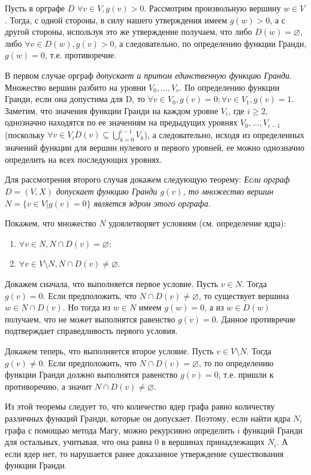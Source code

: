 \documentclass[12pt, letterpaper, titlepage]{article}
\let\emptyset\varnothing
\begin{document}
Пусть в орграфе $D$ $\forall v \in V, g(v)>0$. Рассмотрим произвольную вершину $w \in V$. Тогда, с одной стороны, в силу нашего утверждения
имеем $g(w)>0$, а с другой стороны, используя это же утверждение получаем, что либо $D(w)=\emptyset$, либо $\forall v \in D(w),g(v)>0$, а следовательно,
по определению  функции Гранди, $g(w)=0$, т.е. противоречие.

В первом случае орграф \emph{допускает и притом единственную функцию Гранди}. Множество вершин разбито на уровни $V_0, \dots, V_r$.
По определению функции Гранди, если она допустима для D, то $\forall v \in V_0, g(v)=0; \forall v \in V_1, g(v)=1$.
Заметим, что значения функции Гранди на каждом уровне $V_i$, где $i \geq 2$, однозначно находятся по ее значениям на предыдущих
уровнях $V_0, \dots, V_{i-1}$ (поскольку $\forall v \in V_i D(v) \subseteq \bigcup_{k=0}^{i-1} V_k$), а следовательно, исходя из определенных
значений функции для вершин нулевого и первого уровней, ее можно однозначно определить на всех последующих уровнях.

Для рассмотрения второго случая докажем следующую теорему: \emph{Если орграф $D=(V,X)$ допускает функцию Гранди $g(v)$, то множество вершин
$N=\{v \in V | g(v) =0\}$ является ядром этого орграфа}.

Покажем, что множество $N$ удовлетворяет условиям (см. определение ядра):

\begin{enumerate}
    \item $\forall v \in N, N\cap D(v)=\emptyset$;
    \item $\forall v \in V \setminus N, N \cap D(v) \neq \emptyset$.
\end{enumerate}

Докажем сначала, что выполняется первое условие. Пусть $v \in N$. Тогда $g(v)=0$.
Если предположить, что $N \cap D(v) \neq \emptyset$, то существует вершина $w \in N \cap D(v)$.
Но тогда из $w \in N$ имеем $g(w) = 0$, а из $w \in D(w)$ получаем, что не может выполнятся равенство
$g(v)=0$. Данное противречие подтверждает справедливость первого условия.

Докажем теперь, что выполняется второе условие. Пусть $v \in V \setminus N$. Тогда
$g(v) \neq 0$. Если предположить, что $N \cap D(v) = \emptyset$, то по определению
функции Гранди должно выполнятся равенство $g(v)=0$, т.е. пришли к противоречию, а значит
$N \cap D(v) \neq \emptyset$.

Из этой теоремы следует то, что количество ядер графа равно количеству различных функций Гранди, которые он допускает.
Поэтому, если найти ядра $N_i$ графа с помощью метода Магу, можно рекурсивно определить $i$ функций Гранди для остальных, учитывая, что
она равна 0 в вершинах принадлежащих $N_i$. А если ядер нет, то нарушается ранее доказанное утверждение сушествования функции Гранди.
\end{document}
